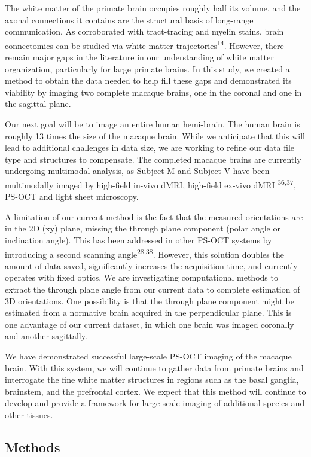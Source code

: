 \documentclass{article}
\begin{document}
The white matter of the primate brain occupies roughly half its volume, and the axonal connections it contains are the structural basis of long-range communication. As corroborated with tract-tracing and myelin stains, brain connectomics can be studied via white matter trajectories\textsuperscript{14}. However, there remain major gaps in the literature in our understanding of white matter organization, particularly for large primate brains. In this study, we created a method to obtain the data needed to help fill these gaps and demonstrated its viability by imaging two complete macaque brains, one in the coronal and one in the sagittal plane.

Our next goal will be to image an entire human hemi-brain. The human brain is roughly 13 times the size of the macaque brain. While we anticipate that this will lead to additional challenges in data size, we are working to refine our data file type and structures to compensate. The completed macaque brains are currently undergoing multimodal analysis, as Subject M and Subject V have been multimodally imaged by high-field in-vivo dMRI, high-field ex-vivo dMRI \textsuperscript{36,37}, PS-OCT and light sheet microscopy.

A limitation of our current method is the fact that the measured orientations are in the 2D (xy) plane, missing the through plane component (polar angle or inclination angle). This has been addressed in other PS-OCT systems by introducing a second scanning angle\textsuperscript{28,38}. However, this solution doubles the amount of data saved, significantly increases the acquisition time, and currently operates with fixed optics. We are investigating computational methods to extract the through plane angle from our current data to complete estimation of 3D orientations. One possibility is that the through plane component might be estimated from a normative brain acquired in the perpendicular plane. This is one advantage of our current dataset, in which one brain was imaged coronally and another sagittally.

We have demonstrated successful large-scale PS-OCT imaging of the macaque brain. With this system, we will continue to gather data from primate brains and interrogate the fine white matter structures in regions such as the basal ganglia, brainstem, and the prefrontal cortex. We expect that this method will continue to develop and provide a framework for large-scale imaging of additional species and other tissues.

\subsection*{Methods}
\end{document}
